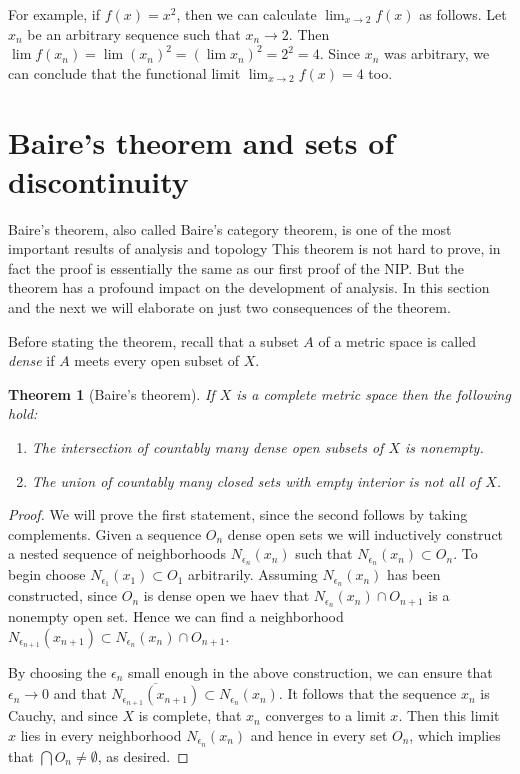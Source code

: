 \documentclass[11pt,oneside]{amsbook}
\theoremstyle{definition}
\theoremstyle{plain}
\newtheorem{theorem}{Theorem}[section]
\theoremstyle{definition}
\theoremstyle{remark}
\numberwithin{equation}{section}
\numberwithin{figure}{section}
\begin{document}
For example, if $f(x)=x^2$, then we can calculate $\lim_{x\to2}f(x)$ as follows. Let $x_n$ be an arbitrary sequence such that $x_n\to2$. Then $\lim f(x_n)=\lim(x_n)^2=(\lim x_n)^2=2^2=4$. Since $x_n$ was arbitrary, we can conclude that the functional limit $\lim_{x\to2}f(x)=4$ too.

\newpage
\section{Baire's theorem and sets of discontinuity}

Baire's theorem, also called Baire's category theorem, is one of the most important results of analysis and topology This theorem is not hard to prove, in fact the proof is essentially the same as our first proof of the NIP. But the theorem has a profound impact on the development of analysis. In this section and the next we will elaborate on just two consequences of the theorem.

Before stating the theorem, recall that a subset $A$ of a metric space is called \emph{dense} if $A$ meets every open subset of $X$.

\begin{theorem}[Baire's theorem]
  If $X$ is a complete metric space then the following hold:
  \begin{enumerate}
  \item The intersection of countably many dense open subsets of $X$ is nonempty.
  \item The union of countably many closed sets with empty interior is not all of $X$.
  \end{enumerate}
\end{theorem}

\begin{proof}
  We will prove the first statement, since the second follows by taking complements. Given a sequence $O_n$ dense open sets we will inductively construct a nested sequence of neighborhoods $N_{\epsilon_n}(x_n)$ such that $N_{\epsilon_n}(x_n)\subset O_n$. To begin choose $N_{\epsilon_1}(x_1)\subset O_1$ arbitrarily. Assuming $N_{\epsilon_n}(x_n)$ has been constructed, since $O_n$ is dense open we haev that $N_{\epsilon_n}(x_n)\cap O_{n+1}$ is a nonempty open set. Hence we can find a neighborhood $N_{\epsilon_{n+1}}(x_{n+1})\subset N_{\epsilon_n}(x_n)\cap O_{n+1}$.

  By choosing the $\epsilon_n$ small enough in the above construction, we can ensure that $\epsilon_n\to0$ and that $\overline{N_{\epsilon_{n+1}}(x_{n+1})}\subset N_{\epsilon_n}(x_n)$. It follows that the sequence $x_n$ is Cauchy, and since $X$ is complete, that $x_n$ converges to a limit $x$. Then this limit $x$ lies in every neighborhood $N_{\epsilon_n}(x_n)$ and hence in every set $O_n$, which implies that $\bigcap O_n\neq\emptyset$, as desired.
\end{proof}
\end{document}
